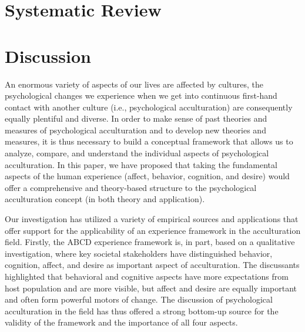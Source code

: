 \documentclass[man, 12pt, a4paper, mask]{apa7}
\begin{document}
\section{Systematic Review}


\section{Discussion}
An enormous variety of aspects of our lives are affected by cultures, the psychological changes we experience when we get into continuous first-hand contact with another culture (i.e., psychological acculturation) are consequently equally plentiful and diverse.
In order to make sense of past theories and measures of psychological acculturation and to develop new theories and measures, it is thus necessary to build a conceptual framework that allows us to analyze, compare, and understand the individual aspects of psychological acculturation.
In this paper, we have proposed that taking the fundamental aspects of the human experience (affect, behavior, cognition, and desire) would offer a comprehensive and theory-based structure to the psychological acculturation concept (in both theory and application). 

Our investigation has utilized a variety of empirical sources and applications that offer support for the applicability of an experience framework in the acculturation field. Firstly, the ABCD experience framework is, in part, based on a qualitative investigation, where key societal stakeholders have distinguished behavior, cognition, affect, and desire as important aspect of acculturation. The discussants highlighted that behavioral and cognitive aspects have more expectations from host population and are more visible, but affect and desire are equally important and often form powerful motors of change. The discussion of psychological acculturation in the field has thus offered a strong bottom-up source for the validity of the framework and the importance of all four aspects.
\end{document}

